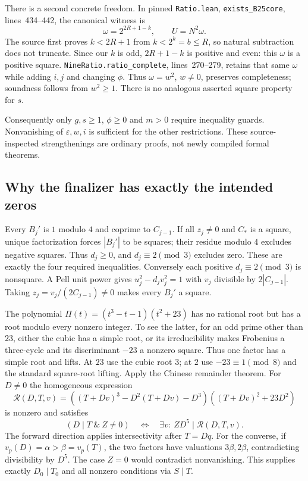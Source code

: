 There is a second concrete freedom. In pinned \texttt{Ratio.lean},
\texttt{exists\_B25core}, lines~434--442, the canonical witness is
\[
 \omega=2^{2R+1-k},\qquad U=N^2\omega.
\]
The source first proves $k<2R+1$ from $k<2^k=b\le R$, so natural
subtraction does not truncate. Since our $k$ is odd,
$2R+1-k$ is positive and even: this $\omega$ is a positive square.
\texttt{NineRatio.ratio\_complete}, lines~270--279, retains that
same $\omega$ while adding $i,j$ and changing $\phi$. Thus
$\omega=w^2$, $w\ne0$, preserves completeness; soundness follows
from $w^2\ge1$. There is no analogous asserted square property for $s$.

Consequently only $g,s\ge1$, $\phi\ge0$ and $m>0$ require inequality
guards. Nonvanishing of $\varepsilon,w,i$ is sufficient for the other
restrictions. These source-inspected strengthenings are ordinary proofs,
not newly compiled formal theorems.

\subsection{Why the finalizer has exactly the intended zeros}
Every $B_j'$ is $1$ modulo $4$ and coprime to $C_{j-1}$.
If all $z_j\ne0$ and $C_*$ is a square, unique factorization forces
$|B_j'|$ to be squares; their residue modulo $4$ excludes negative
squares. Thus $d_j\ge0$, and $d_j\equiv2\pmod3$ excludes zero.
These are exactly the four required inequalities. Conversely each
positive $d_j\equiv2\pmod3$ is nonsquare. A Pell unit power gives
$u_j^2-d_jv_j^2=1$ with $v_j$ divisible by $2|C_{j-1}|$.
Taking $z_j=v_j/(2C_{j-1})\ne0$ makes every $B_j'$ a square.

The polynomial $\Pi(t)=(t^3-t-1)(t^2+23)$ has no rational root but
has a root modulo every nonzero integer. To see the latter, for an
odd prime other than $23$, either the cubic has a simple root, or
its irreducibility makes Frobenius a three-cycle and its discriminant
$-23$ a nonzero square. Thus one factor has a simple root and lifts.
At $23$ use the cubic root $3$; at $2$ use $-23\equiv1\pmod8$ and
the standard square-root lifting. Apply the Chinese remainder theorem.
For $D\ne0$ the homogeneous expression
\[
 \mathcal R(D,T,v)=((T+Dv)^3-D^2(T+Dv)-D^3)
 ((T+Dv)^2+23D^2)
\]
is nonzero and satisfies
\[
 (D\mid T\ \&\ Z\ne0)\quad\Longleftrightarrow\quad
 \exists v:\ ZD^5\mid\mathcal R(D,T,v).
\]
The forward direction applies intersectivity after $T=Dq$.
For the converse, if $v_p(D)=\alpha>\beta=v_p(T)$, the two factors
have valuations $3\beta,2\beta$, contradicting divisibility by $D^5$.
The case $Z=0$ would contradict nonvanishing. This supplies exactly
$D_0\mid T_0$ and all nonzero conditions via $S\mid T$.

